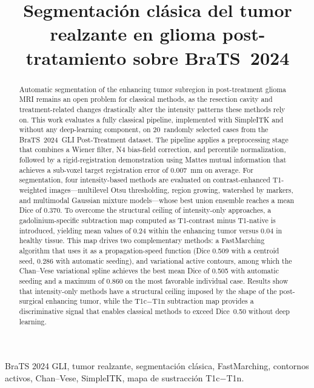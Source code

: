\documentclass[conference]{IEEEtran}
\title{Segmentaci\'{o}n cl\'{a}sica del tumor realzante en glioma
post-tratamiento sobre BraTS~2024}
\author{%
\IEEEauthorblockN{Abel Albuez, Victoria Acero y Santiago Gil}
\IEEEauthorblockA{Maestr\'{i}a en Ingenier\'{i}a de Sistemas y Computaci\'{o}n\\
Pontificia Universidad Javeriana, Bogot\'{a} D.C., Colombia\\
Procesamiento de Im\'{a}genes M\'{e}dicas, 2026\\
\url{https://github.com/AbelAlbuez/medical-image-processing}}}
\begin{document}
\maketitle

\begin{abstract}
Automatic segmentation of the enhancing tumor subregion in
post-treatment glioma MRI remains an open problem for classical
methods, as the resection cavity and treatment-related changes
drastically alter the intensity patterns these methods rely on.
This work evaluates a fully classical pipeline, implemented with
SimpleITK and without any deep-learning component, on 20~randomly
selected cases from the BraTS~2024~GLI Post-Treatment dataset.
The pipeline applies a preprocessing stage that combines a Wiener
filter, N4 bias-field correction, and percentile normalization,
followed by a rigid-registration demonstration using Mattes mutual
information that achieves a sub-voxel target registration error
of 0.007~mm on average.
For segmentation, four intensity-based methods are evaluated on
contrast-enhanced T1-weighted images---multilevel Otsu
thresholding, region growing, watershed by markers, and
multimodal Gaussian mixture models---whose best union ensemble
reaches a mean Dice of 0.370.
To overcome the structural ceiling of intensity-only approaches,
a gadolinium-specific subtraction map computed as T1-contrast
minus T1-native is introduced, yielding mean values of 0.24
within the enhancing tumor versus 0.04 in healthy tissue.
This map drives two complementary methods: a FastMarching
algorithm that uses it as a propagation-speed function (Dice
0.509 with a centroid seed, 0.286 with automatic seeding), and
variational active contours, among which the Chan--Vese
variational spline achieves the best mean Dice of 0.505 with
automatic seeding and a maximum of 0.860 on the most favorable
individual case.
Results show that intensity-only methods have a structural
ceiling imposed by the shape of the post-surgical enhancing
tumor, while the T1c$-$T1n subtraction map provides a
discriminative signal that enables classical methods to exceed
Dice~0.50 without deep learning.
\end{abstract}

\begin{IEEEkeywords}
BraTS 2024 GLI, tumor realzante, segmentaci\'{o}n cl\'{a}sica,
FastMarching, contornos activos, Chan--Vese, SimpleITK, mapa de
sustracci\'{o}n T1c$-$T1n.
\end{IEEEkeywords}
\end{document}
